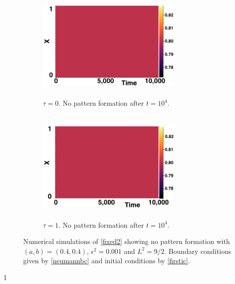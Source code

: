 \begin{figure}[H]
    \centering
    \begin{subfigure}[b]{0.45\textwidth}
        \centering
        \includegraphics[width=7cm,height = 5.5cm]{nopatt1.png}
        \caption{$\tau=0$. No pattern formation after $t=10^4$. }
        \label{}
    \end{subfigure}
    \hfill
    \begin{subfigure}[b]{0.45\textwidth}
        \centering
        \includegraphics[width=7cm,height = 5.5cm]{nopatt2.png}
        \caption{$\tau=1.$ No pattern formation after $t=10^4$.}
        \label{}
    \end{subfigure}
    \caption{Numerical simulations of \eqref{fixed2} showing no pattern formation with $(a,b)=(0.4,0.4)$, $\epsilon^2=0.001$ and $L^2=9/2$. Boundary conditions given by \eqref{neumannbc} and initial conditions by \eqref{firstic}.}
    \label{fig:fixedsim1}
\end{figure}1

